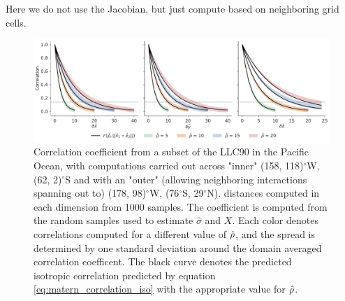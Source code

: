 Here we do not use the Jacobian, but just compute based on neighboring grid
cells.
\begin{figure}
    \centering
    \includegraphics[width=\textwidth]{../figures/matern_llc90_correlation-k25-iy120-ix80-1000samples-4curves.pdf}
    \caption{Correlation coefficient from a subset of the LLC90 in the Pacific
        Ocean, with computations carried out across "inner"
        (158, 118)$^\circ$W,
        (62, 2)$^\circ$S and
        with an "outer" (allowing neighboring interactions spanning out to)
        (178, 98)$^\circ$W,
        (76$^\circ$S, 29$^\circ$N).
        distances computed in each dimension from 1000 samples. The coefficient is
        computed from the random samples used to estimate
        $\hat{\sigma}$ and $X$. Each color denotes correlations computed for a
        different value of $\hat{\rho}$, and the spread is determined by one standard
        deviation around the domain averaged correlation coefficent.
        The black curve denotes the predicted isotropic correlation predicted by
        equation \eqref{eq:matern_correlation_iso} with the appropriate value for
        $\hat{\rho}$.}
    \label{fig:llc90_correlations}
\end{figure}

